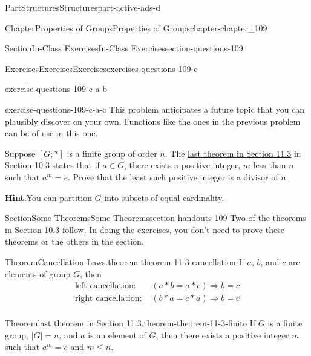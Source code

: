 \documentclass[oneside,10pt,]{book}
\newcommand{\blocktitlefont}{\relax}
\numberwithin{equation}{section}
\begin{document}
\begin{partptx}{Part}{Structures}{}{Structures}{}{}{part-active-ads-d}
\begin{chapterptx}{Chapter}{Properties of Groups}{}{Properties of Groups}{}{}{chapter-chapter_109}
\begin{sectionptx}{Section}{In-Class Exercises}{}{In-Class Exercises}{}{}{section-questions-109}
\begin{exercises-subsection-numberless}{Exercises}{Exercises}{}{Exercises}{}{}{exercises-questions-109-c}
\begin{exercisegroup}
\begin{divisionexerciseeg}{2}{}{}{exercise-questions-109-c-a-b}
\end{divisionexerciseeg}%
\begin{divisionexerciseeg}{3}{}{}{exercise-questions-109-c-a-c}%
This problem anticipates a future topic that you can plausibly discover on your own. Functions like the ones in the previous problem can be of use in this one.%
\par
Suppose \([G;*]\) is a finite group of order \(n\). The \hyperref[theorem-theorem-11-3-finite]{last theorem in Section 11.3} in Section 10.3 states that if \(a\in G\), there exists a positive integer, \(m\) less than \(n\) such that \(a^m=e\).  Prove that the least such positive integer is a divisor of \(n\).%
\par\smallskip%
\noindent\textbf{\blocktitlefont Hint}.\hypertarget{hint-questions-109-c-a-c-b}{}\quad{}You can partition \(G\) into subsets of equal cardinality.%
\end{divisionexerciseeg}%
\end{exercisegroup}
\par\medskip\noindent
\end{exercises-subsection-numberless}
\end{sectionptx}
%
%
\typeout{************************************************}
\typeout{************************************************}
%
\begin{sectionptx}{Section}{Some Theorems}{}{Some Theorems}{}{}{section-handouts-109}
Two of the theorems in Section 10.3 follow. In doing the exercises, you don't need to prove these theorems or the others in the section.%
\begin{theorem}{Theorem}{Cancellation Laws.}{}{theorem-theorem-11-3-cancellation}%
%
If \(a\), \(b\), and \(c\) are elements of group \(G\), then%
\begin{equation*}
\begin{array}{lc}
\textrm{left cancellation: }& (a * b = a * c)  \Rightarrow b = c\\
\textrm{right cancellation: }&  (b * a = c * a) \Rightarrow b = c\\
\end{array}
\end{equation*}
%
\end{theorem}
\begin{theorem}{Theorem}{last theorem in Section 11.3.}{}{theorem-theorem-11-3-finite}%
If \(G\) is a finite group,  \(\left| G\right| = n\), and \(a\) is an element of \(G\), then there exists a positive integer \(m\) such that \(a^m= e\) and \(m\leq n\).%

\end{theorem}
\end{sectionptx}
\end{chapterptx}
\end{partptx}
\end{document}
